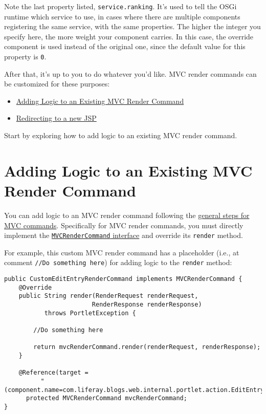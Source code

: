 Note the last property listed, \texttt{service.ranking}. It's used to
tell the OSGi runtime which service to use, in cases where there are
multiple components registering the same service, with the same
properties. The higher the integer you specify here, the more weight
your component carries. In this case, the override component is used
instead of the original one, since the default value for this property
is \texttt{0}.

After that, it's up to you to do whatever you'd like. MVC render
commands can be customized for these purposes:

\begin{itemize}
\tightlist
\item
  \hyperref[adding-logic-to-an-existing-mvc-render-command]{Adding Logic
  to an Existing MVC Render Command}
\item
  \hyperref[redirecting-to-a-new-jsp]{Redirecting to a new JSP}
\end{itemize}

Start by exploring how to add logic to an existing MVC render command.

\section{Adding Logic to an Existing MVC Render
Command}\label{adding-logic-to-an-existing-mvc-render-command}

You can add logic to an MVC render command following the
\href{/docs/7-2/customization/-/knowledge_base/c/adding-logic-to-mvc-commands}{general
steps for MVC commands}. Specifically for MVC render commands, you must
directly implement the
\href{https://docs.liferay.com/dxp/portal/7.2-latest/javadocs/portal-kernel/com/liferay/portal/kernel/portlet/bridges/mvc/MVCRenderCommand.html}{\texttt{MVCRenderCommand}
interface} and override its \texttt{render} method.

For example, this custom MVC render command has a placeholder (i.e., at
comment \texttt{//Do\ something\ here}) for adding logic to the
\texttt{render} method:

\begin{verbatim}
public CustomEditEntryRenderCommand implements MVCRenderCommand {
    @Override
    public String render(RenderRequest renderRequest, 
                        RenderResponse renderResponse)
           throws PortletException {

        //Do something here

        return mvcRenderCommand.render(renderRequest, renderResponse);
    }

    @Reference(target = 
          "(component.name=com.liferay.blogs.web.internal.portlet.action.EditEntryMVCRenderCommand)")
      protected MVCRenderCommand mvcRenderCommand;
}
\end{verbatim}


